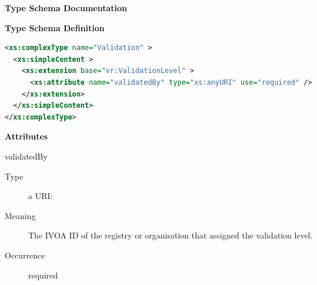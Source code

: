 \documentclass[11pt,a4paper]{ivoa}
\begin{document}
\begin{generated}
\begingroup
        \renewcommand*\descriptionlabel[1]{%
        \hbox to 5.5em{\emph{#1}\hfil}}\vspace{2ex}\noindent\textbf{ Type Schema Documentation}


\vspace{1ex}\noindent\textbf{ Type Schema Definition}

\begin{lstlisting}[language=XML,basicstyle=\footnotesize]
<xs:complexType name="Validation" >
  <xs:simpleContent >
    <xs:extension base="vr:ValidationLevel" >
      <xs:attribute name="validatedBy" type="xs:anyURI" use="required" />
    </xs:extension>
  </xs:simpleContent>
</xs:complexType>
\end{lstlisting}

\vspace{0.5ex}\noindent\textbf{ Attributes}

\begingroup\small\begin{bigdescription}
\item[validatedBy]
\begin{description}
\item[Type] a URI: 
\item[Meaning]
               The IVOA ID of the registry or organisation that
               assigned the validation level.

\item[Occurrence] required
\end{description}


\end{bigdescription}\endgroup

\endgroup
\end{generated}

\end{document}
